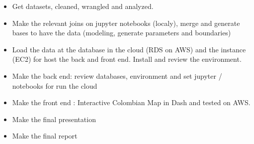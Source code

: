 \documentclass[11pt]{article}
\begin{document}
\begin{itemize}
\item Get datasets, cleaned, wrangled and analyzed.
\item Make the relevant joins on jupyter notebooks (localy), merge and generate bases to have the data (modeling, generate parameters and boundaries)
\item Load the data at the database in the cloud (RDS on AWS) and the instance (EC2) for host the back and front end. Install and review the environment.
\item Make the back end: review databases, environment and set jupyter / notebooks for run the cloud
\item Make the front end : Interactive Colombian Map in Dash and tested on AWS.
\item Make the final presentation
\item Make the final report
\end{itemize}

%
%




\end{document}
